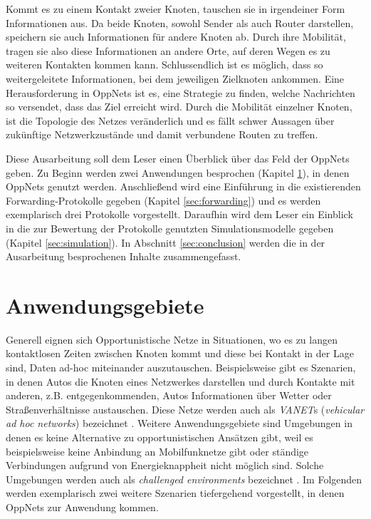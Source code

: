 \documentclass[a4paper, 12pt]{article}
\begin{document}
Kommt es zu einem Kontakt zweier Knoten, tauschen sie in irgendeiner Form Informationen aus. Da beide Knoten, sowohl Sender als auch Router darstellen, speichern sie auch Informationen für andere Knoten ab. Durch ihre Mobilität, tragen sie also diese Informationen an andere Orte, auf deren Wegen es zu weiteren Kontakten kommen kann. Schlussendlich ist es möglich, dass so weitergeleitete Informationen, bei dem jeweiligen Zielknoten ankommen.
Eine Herausforderung in OppNets ist es, eine Strategie zu finden, welche Nachrichten so versendet, dass das Ziel erreicht wird. Durch die Mobilität einzelner Knoten, ist die Topologie des Netzes veränderlich und es fällt schwer  Aussagen über zukünftige Netzwerkzustände und damit verbundene Routen zu treffen.

Diese Ausarbeitung soll dem Leser einen Überblick über das Feld der OppNets geben. Zu Beginn werden zwei Anwendungen besprochen (Kapitel \ref{sec:applications}), in denen OppNets genutzt werden. Anschließend wird eine Einführung in die existierenden Forwarding-Protokolle gegeben (Kapitel \ref{sec:forwarding}) und es werden exemplarisch drei Protokolle vorgestellt. Daraufhin wird dem Leser ein Einblick in die zur Bewertung der Protokolle genutzten Simulationsmodelle gegeben (Kapitel \ref{sec:simulation}). 
In Abschnitt \ref{sec:conclusion} werden die in der Ausarbeitung besprochenen Inhalte zusammengefasst.


\section{Anwendungsgebiete}
\label{sec:applications}
Generell eignen sich Opportunistische Netze in Situationen, wo es zu langen kontaktlosen Zeiten zwischen Knoten kommt und diese bei Kontakt in der Lage sind, Daten ad-hoc miteinander auszutauschen.
Beispielsweise gibt es Szenarien, in denen Autos die Knoten eines Netzwerkes darstellen und durch Kontakte mit anderen, z.B. entgegenkommenden, Autos Informationen über Wetter oder Straßenverhältnisse austauschen. Diese Netze werden auch als \emph{VANET}s (\emph{vehicular ad hoc networks}) bezeichnet \cite{Mota20145}.
Weitere Anwendungsgebiete sind Umgebungen in denen es keine Alternative zu opportunistischen Ansätzen gibt, weil es beispielsweise keine Anbindung an Mobilfunknetze gibt oder ständige Verbindungen aufgrund von Energieknappheit nicht möglich sind. Solche Umgebungen werden auch als \emph{challenged environments} bezeichnet \cite{Mota20145}.
Im Folgenden werden exemplarisch zwei weitere Szenarien tiefergehend vorgestellt, in denen OppNets zur Anwendung kommen.
\end{document}
